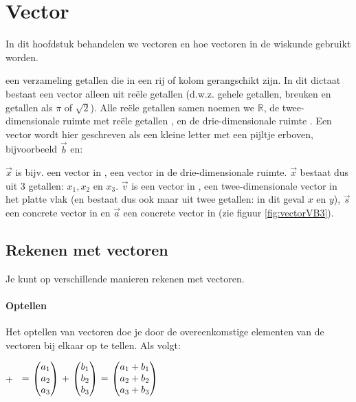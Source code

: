 \chapter{Vector}
\label{chap:vectoren}
In dit hoofdstuk behandelen we vectoren en hoe vectoren in de wiskunde gebruikt worden.

 {een verzameling getallen die in een rij of kolom gerangschikt zijn.} In dit dictaat bestaat een vector alleen uit reële getallen (d.w.z. gehele getallen, breuken en getallen als $\pi$ of $\sqrt{2}$). Alle reële getallen samen noemen we $\mathbb{R}$, de twee-dimensionale ruimte met reële getallen \RT, en de drie-dimensionale ruimte \RD.
Een vector wordt hier geschreven als een kleine letter met een pijltje erboven, bijvoorbeeld $\vec{b}$ en: 


$\vec{x}$ is bijv. een vector in \RD, een vector in de drie-dimensionale ruimte. $ \vec{x} $  bestaat dus uit 3 getallen: $x_{1}, x_{2}$  en $x_{3}$. $\vec{v}$ is een vector in \RT, een twee-dimensionale vector in het platte vlak (en bestaat dus ook maar uit twee getallen: in dit geval $x$ en $y$), $\vec{s}$ een concrete vector in  \RD en $ \vec{a}  $ een concrete vector in \RT (zie figuur  \ref{fig:vectorVB3}).



\section{Rekenen met vectoren}
Je kunt op verschillende manieren rekenen met vectoren.

\subsubsection{Optellen}
Het optellen van vectoren doe je door de overeenkomstige elementen van de vectoren bij elkaar op te tellen. Als volgt:

\newpage
{}
{ +  \ $=\ \vecdriesnel{a} \ + \ \vecdriesnel{b} \ = \ \vecdrie{a_1+b_1}{a_2+b_2}{a_3+b_3} $} 

